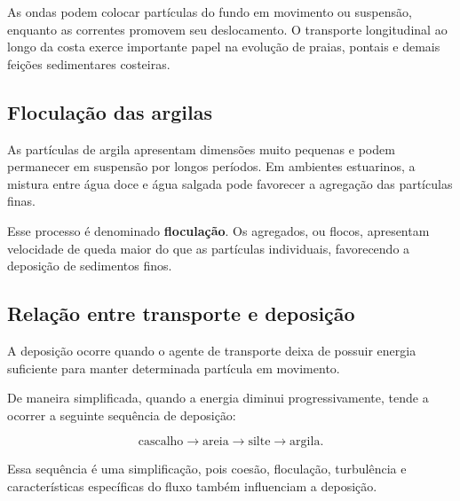 As ondas podem colocar partículas do fundo em movimento ou suspensão, enquanto
as correntes promovem seu deslocamento. O transporte longitudinal ao longo da
costa exerce importante papel na evolução de praias, pontais e demais feições
sedimentares costeiras.

\subsection{Floculação das argilas}

As partículas de argila apresentam dimensões muito pequenas e podem permanecer
em suspensão por longos períodos. Em ambientes estuarinos, a mistura entre água
doce e água salgada pode favorecer a agregação das partículas finas.

Esse processo é denominado \textbf{floculação}. Os agregados, ou flocos,
apresentam velocidade de queda maior do que as partículas individuais,
favorecendo a deposição de sedimentos finos.

\subsection{Relação entre transporte e deposição}

A deposição ocorre quando o agente de transporte deixa de possuir energia
suficiente para manter determinada partícula em movimento.

De maneira simplificada, quando a energia diminui progressivamente, tende a
ocorrer a seguinte sequência de deposição:

\[
\text{cascalho}
\rightarrow
\text{areia}
\rightarrow
\text{silte}
\rightarrow
\text{argila}.
\]

Essa sequência é uma simplificação, pois coesão, floculação, turbulência e
características específicas do fluxo também influenciam a deposição.


